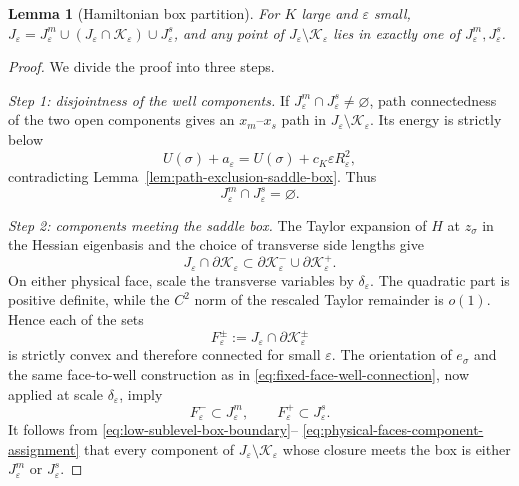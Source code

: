 \documentclass[11pt]{article}
\numberwithin{equation}{section}
\theoremstyle{plain}
\newtheorem{lemma}[theorem]{Lemma}
\theoremstyle{definition}
\theoremstyle{remark}
\newcommand{\eps}{\varepsilon}
\begin{document}
\begin{lemma}[Hamiltonian box partition]
\label{lem:box-partition-low-sublevel}
For $K$ large and $\eps$ small,
$J_\eps=J_\eps^m\cup(J_\eps\cap\mathcal K_\eps)\cup J_\eps^s$, and any point of
$J_\eps\setminus\mathcal K_\eps$ lies in exactly one of $J_\eps^m,J_\eps^s$.
\end{lemma}

\begin{proof}
We divide the proof into three steps.

\emph{Step 1: disjointness of the well components.}
If $J_\eps^m\cap J_\eps^s\ne\varnothing$, path connectedness of the two open
components gives an $x_m$--$x_s$ path in
$J_\eps\setminus\mathcal K_\eps$.  Its energy is strictly below
\[
U(\sigma)+a_\eps
=U(\sigma)+c_K\eps R_\eps^2,
\]
contradicting Lemma~\ref{lem:path-exclusion-saddle-box}.  Thus
\begin{equation}
\label{eq:well-components-disjoint}
J_\eps^m\cap J_\eps^s=\varnothing.
\end{equation}

\emph{Step 2: components meeting the saddle box.}
The Taylor expansion of $H$ at $z_\sigma$ in the Hessian eigenbasis and the
choice of transverse side lengths give
\begin{equation}
\label{eq:low-sublevel-box-boundary}
J_\eps\cap\partial\mathcal K_\eps
\subset
\partial\mathcal K_\eps^-\cup\partial\mathcal K_\eps^+.
\end{equation}
On either physical face, scale the transverse variables by $\delta_\eps$.
The quadratic part is positive definite, while the $C^2$ norm of the rescaled
Taylor remainder is $o(1)$.  Hence each of the sets
\[
F_\eps^\pm
:=J_\eps\cap\partial\mathcal K_\eps^\pm
\]
is strictly convex and therefore connected for small $\eps$.  The orientation
of $e_\sigma$ and the same face-to-well construction as in
\eqref{eq:fixed-face-well-connection}, now applied at scale $\delta_\eps$,
imply
\begin{equation}
\label{eq:physical-faces-component-assignment}
F_\eps^-\subset J_\eps^m,
\qquad
F_\eps^+\subset J_\eps^s.
\end{equation}
It follows from \eqref{eq:low-sublevel-box-boundary}--
\eqref{eq:physical-faces-component-assignment} that every component of
$J_\eps\setminus\mathcal K_\eps$ whose closure meets the box is either
$J_\eps^m$ or $J_\eps^s$.


\end{proof}
\end{document}
